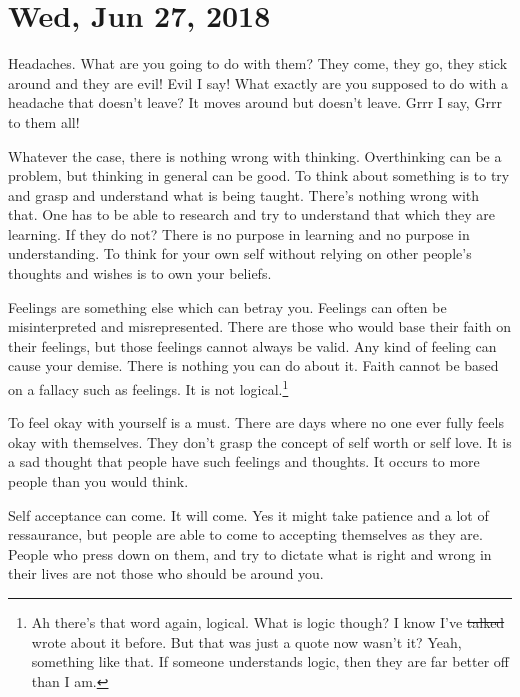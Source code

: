 \section{Wed, Jun 27, 2018}

Headaches. What are you going to do with them? They come, they go, they stick
around and they are evil! Evil I say! What exactly are you supposed to do with a
headache that doesn't leave? It moves around but doesn't leave. Grrr I say, Grrr
to them all!

Whatever the case, there is nothing wrong with thinking. Overthinking can be a
problem, but thinking in general can be good. To think about something is to try
and grasp and understand what is being taught. There's nothing wrong with that.
One has to be able to research and try to understand that which they are
learning. If they do not? There is no purpose in learning and no purpose in
understanding. To think for your own self without relying on other people's
thoughts and wishes is to own your beliefs.

Feelings are something else which can betray you. Feelings can often be
misinterpreted and misrepresented. There are those who would base their faith on
their feelings, but those feelings cannot always be valid. Any kind of feeling
can cause your demise. There is nothing you can do about it. Faith cannot be
based on a fallacy such as feelings. It is not logical.\footnote{
Ah there's that word again, logical. What is logic though? I know I've 
\st{talked} wrote about it before. But that was just a quote now wasn't it?
Yeah, something like that. If someone understands logic, then they are far
better off than I am.
}

To feel okay with yourself is a must. There are days where no one ever fully
feels okay with themselves. They don't grasp the concept of self worth or self
love. It is a sad thought that people have such feelings and thoughts. It occurs
to more people than you would think.

Self acceptance can come. It will come. Yes it might take patience and a lot of
ressaurance, but people are able to come to accepting themselves as they are.
People who press down on them, and try to dictate what is right and wrong in
their lives are not those who should be around you.